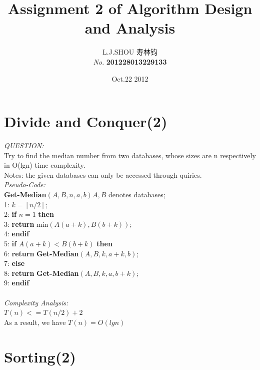\documentclass[11pt]{article}
\begin{document}
\begin{CJK}{UTF8}{gbsn}
\title{ \textbf{Assignment 2 of Algorithm Design and Analysis}}
\author{L.J.SHOU  寿林钧\\{\slshape No}. \bf 201228013229133}
\date{Oct.22 2012}
\maketitle %
\section{Divide and Conquer(2)}
{\em \sf QUESTION:}\\[1mm]
Try to find the median number from two databases, whose sizes are n respectively in O(lgn) time complexity. \\
{\footnotesize Notes: the given databases can only be accessed through quiries.}\\[1mm]
{\em \sf Pseudo-Code:}\\[1mm]
{\bf {\bf Get-Median}}$(A,B,n,a,b) A, B$ denotes databases;\\
 1: $k=[n/2];$                                 \\
 2: {\bf if} $n=1$ {\bf then}                             \\ 
 3:          {\bf return} min$(A(a+k),B(b+k))$;\\
 4: {\bf endif}\\
 5: {\bf if} $A(a+k)<B(b+k)$ {\bf then}\\
 6:          {\bf return} {\bf Get-Median}$(A,B,k,a+k,b)$;\\
 7: {\bf else}\\
 8:          {\bf return} {\bf Get-Median}$(A,B,k,a,b+k)$;\\
 9: {\bf {\bf endif}}\\
 \\
{\em \sf Complexity Analysis:}\\[1mm]
$T(n)<=T(n/2)+2$\\
As a result, we have $T(n)=O(lgn)$\\

\newpage \section{Sorting(2)}


\end{CJK}
\end{document}
